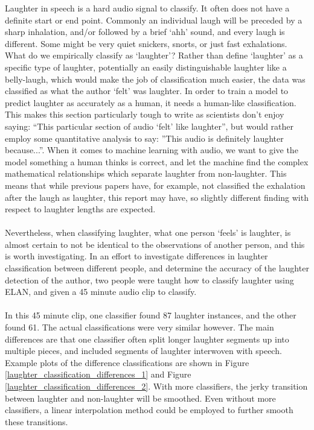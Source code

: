 \documentclass[a4paper,11pt,notitlepage]{article}
\begin{document}
Laughter in speech is a hard audio signal to classify. It often does not have a definite start or end point. Commonly an individual laugh will be preceded by a sharp inhalation, and/or followed by a brief `ahh' sound, and every laugh is different. Some might be very quiet snickers, snorts, or just fast exhalations. What do we empirically classify as `laughter'? Rather than define `laughter' as a specific type of laughter, potentially an easily distinguishable laughter like a belly-laugh, which would make the job of classification much easier, the data was classified as what the author `felt' was laughter. In order to train a model to predict laughter as accurately as a human, it needs a human-like classification. This makes this section particularly tough to write as scientists don't enjoy saying: ``This particular section of audio `felt' like laughter'', but would rather employ some quantitative analysis to say: ''This audio is definitely laughter because...''. When it comes to machine learning with audio, we want to give the model something a human thinks is correct, and let the machine find the complex mathematical relationships which separate laughter from non-laughter. This means that while previous papers have, for example, not classified the exhalation after the laugh as laughter\cite{bachorowski2001acoustic}, this report may have, so slightly different finding with respect to laughter lengths are expected.\\
\\
Nevertheless, when classifying laughter, what one person `feels' is laughter, is almost certain to not be identical to the observations of another person, and this is worth investigating. In an effort to investigate differences in laughter classification between different people, and determine the accuracy of the laughter detection of the author, two people were taught how to classify laughter using ELAN, and given a 45 minute audio clip to classify.\\
\\
In this 45 minute clip, one classifier found 87 laughter instances, and the other found 61. The actual classifications were very similar however. The main differences are that one classifier often split longer laughter segments up into multiple pieces, and included segments of laughter interwoven with speech. Example plots of the difference classifications are shown in Figure \ref{laughter_classification_differences_1} and Figure \ref{laughter_classification_differences_2}. With more classifiers, the jerky transition between laughter and non-laughter will be smoothed. Even without more classifiers, a linear interpolation method could be employed to further smooth these transitions.
\end{document}
